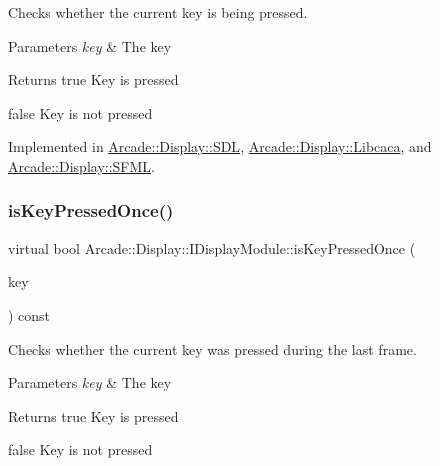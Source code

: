 Checks whether the current key is being pressed. 


\begin{DoxyParams}{Parameters}
{\em key} & The key \\
\hline
\end{DoxyParams}
\begin{DoxyReturn}{Returns}
true Key is pressed 

false Key is not pressed 
\end{DoxyReturn}


Implemented in \mbox{\hyperlink{classArcade_1_1Display_1_1SDL_ab7a692d8968af7633a92042ee006b83a}{Arcade\+::\+Display\+::\+S\+DL}}, \mbox{\hyperlink{classArcade_1_1Display_1_1Libcaca_aad274dc246f3140fe623bbd3b260da07}{Arcade\+::\+Display\+::\+Libcaca}}, and \mbox{\hyperlink{classArcade_1_1Display_1_1SFML_ad33097d101e94bbb65ea4eed560e03c4}{Arcade\+::\+Display\+::\+S\+F\+ML}}.

\mbox{\label{classArcade_1_1Display_1_1IDisplayModule_a531b700b332e077d9b714bafac05ebe1}} 
\subsubsection{\texorpdfstring{isKeyPressedOnce()}{isKeyPressedOnce()}}
{\footnotesize\ttfamily virtual bool Arcade\+::\+Display\+::\+I\+Display\+Module\+::is\+Key\+Pressed\+Once (\begin{DoxyParamCaption}\item[{\mbox{\hyperlink{classArcade_1_1Display_1_1IDisplayModule_a8da3f6b309ca0581473ae8cc8789b619}{I\+Display\+Module\+::\+Keys}}}]{key }\end{DoxyParamCaption}) const\hspace{0.3cm}{\ttfamily [pure virtual]}}



Checks whether the current key was pressed during the last frame. 


\begin{DoxyParams}{Parameters}
{\em key} & The key \\
\hline
\end{DoxyParams}
\begin{DoxyReturn}{Returns}
true Key is pressed 

false Key is not pressed 
\end{DoxyReturn}


